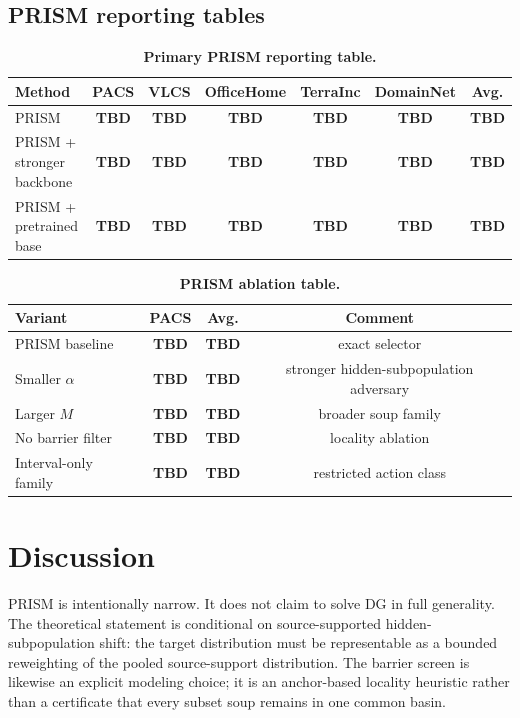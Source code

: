 \documentclass{article}
\newcommand{\TBD}{\textbf{TBD}}
\newcommand{\prism}{\textup{\textsc{PRISM}}}
\newcommand{\1}{\mathbbm{1}}
\begin{document}
\subsection{\prism{} reporting tables}

\begin{table}[t]
    \centering
    \small
    \caption{\textbf{Primary \prism{} reporting table.}}
    \label{tab:prism_tbd}
    \setlength{\tabcolsep}{7pt}
    \begin{tabular}{lcccccc}
        \toprule
        Method & PACS & VLCS & OfficeHome & TerraInc & DomainNet & Avg. \\
        \midrule
        \prism{} & \TBD & \TBD & \TBD & \TBD & \TBD & \TBD \\
        \prism{} + stronger backbone & \TBD & \TBD & \TBD & \TBD & \TBD & \TBD \\
        \prism{} + pretrained base & \TBD & \TBD & \TBD & \TBD & \TBD & \TBD \\
        \bottomrule
    \end{tabular}
\end{table}

\begin{table}[t]
    \centering
    \small
    \caption{\textbf{\prism{} ablation table.}}
    \label{tab:ablation_tbd}
    \setlength{\tabcolsep}{8pt}
    \begin{tabular}{lccc}
        \toprule
        Variant & PACS & Avg. & Comment \\
        \midrule
        \prism{} baseline & \TBD & \TBD & exact selector \\
        Smaller \(\alpha\) & \TBD & \TBD & stronger hidden-subpopulation adversary \\
        Larger \(M\) & \TBD & \TBD & broader soup family \\
        No barrier filter & \TBD & \TBD & locality ablation \\
        Interval-only family & \TBD & \TBD & restricted action class \\
        \bottomrule
    \end{tabular}
\end{table}

\section{Discussion}

\prism{} is intentionally narrow. It does not claim to solve DG in full generality. The theoretical statement is conditional on source-supported hidden-subpopulation shift: the target distribution must be representable as a bounded reweighting of the pooled source-support distribution. The barrier screen is likewise an explicit modeling choice; it is an anchor-based locality heuristic rather than a certificate that every subset soup remains in one common basin.
\end{document}
